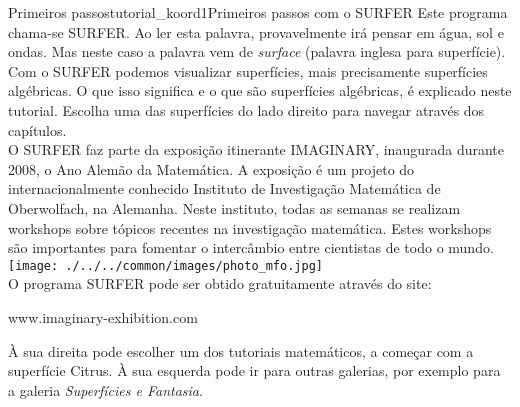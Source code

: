 \begin{surferIntroPage}{Primeiros passos}{tutorial_koord1}{Primeiros passos com o SURFER}
Este programa chama-se SURFER. Ao ler esta palavra, provavelmente ir\'a pensar em \'agua, sol e ondas. Mas neste caso a palavra vem de {\it surface} (palavra inglesa para superf\'icie).
\\
Com o SURFER podemos visualizar  superf\'icies, mais precisamente superf\'icies alg\'ebricas. O que isso significa e o que s\~ao superf\'icies alg\'ebricas, \'e explicado neste tutorial. Escolha uma das superf\'icies do lado direito para navegar atrav\'es dos cap\'itulos.\\
O SURFER faz parte da exposi\c c\~ao itinerante IMAGINARY, inaugurada durante 2008, o  Ano Alem\~ao da Matem\'atica. A exposi\c c\~ao \'e um projeto do internacionalmente conhecido Instituto de Investiga\c c\~ao Matem\' atica de Oberwolfach, na Alemanha. Neste instituto, todas as semanas se realizam  workshops sobre t\'opicos recentes na investiga\c c\~ao matem\'atica. Estes workshops s\~ao importantes para fomentar o interc\^ambio entre cientistas de todo o mundo. \\
\vspace{0.2cm} \hspace{3.5cm}\texttt{[image: ./../../common/images/photo\_mfo.jpg]}\\
O programa SURFER pode ser obtido gratuitamente atrav\'es do site: \\
\begin{centering}
www.imaginary-exhibition.com\\
\end{centering}
 \vspace{0.2cm}
\`A sua direita pode escolher um dos tutoriais matem\'aticos, a come\c car com a superf\'icie Citrus. \`A sua esquerda pode ir para outras galerias, por exemplo para a galeria  {\it Superf\'icies e Fantasia}.
\end{surferIntroPage}
